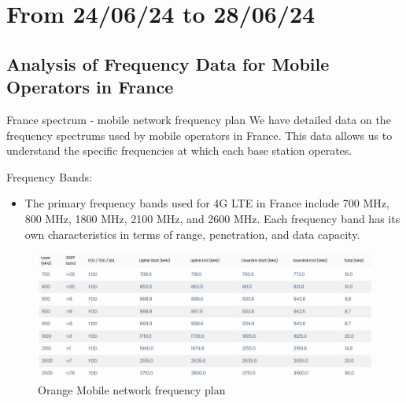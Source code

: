 \smallframetitle

\section{From 24/06/24 to 28/06/24}
\insertsectionframe

\subsection{Analysis of Frequency Data for Mobile Operators in France}
\insertsubsectionframe

\begin{frame}{France spectrum - mobile network frequency plan}
    We have detailed data on the frequency spectrums used by mobile operators in France. This data allows us to understand the specific frequencies at which each base station operates.
    \begin{block}{Frequency Bands:}
        \begin{itemize}
            \item The primary frequency bands used for 4G LTE in France include 700 MHz, 800 MHz, 1800 MHz, 2100 MHz, and 2600 MHz.
            Each frequency band has its own characteristics in terms of range, penetration, and data capacity.
        \end{itemize}
    \end{block}
    \begin{figure}
        \includegraphics[height=0.4\paperheight]{images/Altair/Or_spectrum.png}
        \caption{Orange Mobile network frequency plan}
    \end{figure}
\end{frame}

